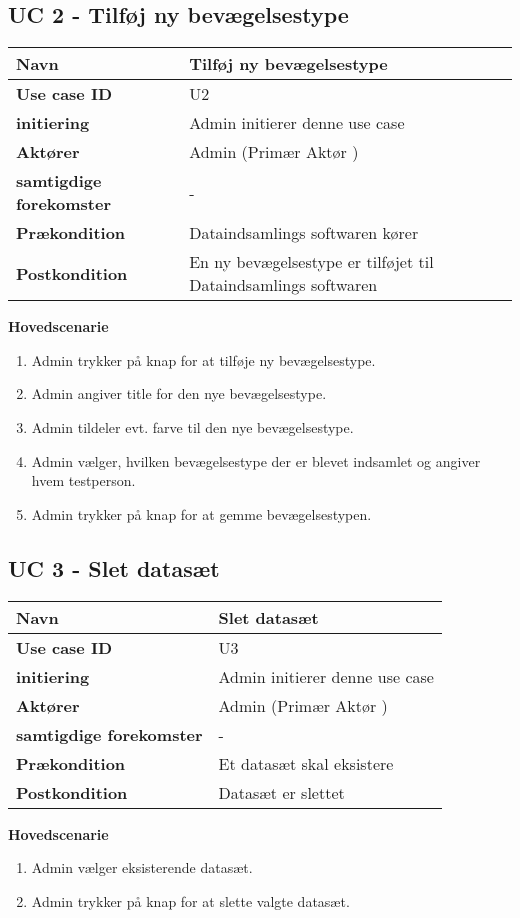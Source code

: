 \subsection{UC 2 - Tilføj ny bevægelsestype}
\begin{table}[htbp] 
	\begin{tabular}{|p{5cm}|p{9cm}|}
		\hline
		\textbf{Navn} & Tilføj ny bevægelsestype \\ \hline
		\textbf{Use case ID} & U2 \\ \hline
		\textbf{initiering} & Admin initierer denne use case \\ \hline
		\textbf{Aktører} & Admin (Primær Aktør ) \\ \hline
		\textbf{samtigdige forekomster} & - \\ \hline
		\textbf{Prækondition} & Dataindsamlings softwaren kører \\ \hline
		\textbf{Postkondition} & En ny bevægelsestype er tilføjet til Dataindsamlings softwaren \\ \hline
	\end{tabular}
\end{table}
\textbf{Hovedscenarie}
\begin{enumerate}
	\item Admin trykker på knap for at tilføje ny bevægelsestype.
	\item Admin angiver title for den nye bevægelsestype.
	\item Admin tildeler evt. farve til den nye bevægelsestype.
	\item Admin vælger, hvilken bevægelsestype der er blevet indsamlet og angiver hvem testperson.
	\item Admin trykker på knap for at gemme bevægelsestypen.
\end{enumerate}

\subsection{UC 3 - Slet datasæt}
\begin{table}[htbp] 
	\begin{tabular}{|p{5cm}|p{9cm}|}
		\hline
		\textbf{Navn} & Slet datasæt \\ \hline
		\textbf{Use case ID} & U3 \\ \hline
		\textbf{initiering} & Admin initierer denne use case \\ \hline
		\textbf{Aktører} & Admin (Primær Aktør ) \\ \hline
		\textbf{samtigdige forekomster} & - \\ \hline
		\textbf{Prækondition} & Et datasæt skal eksistere \\ \hline
		\textbf{Postkondition} & Datasæt er slettet \\ \hline
	\end{tabular}
\end{table}
\textbf{Hovedscenarie}
\begin{enumerate}
	\item Admin vælger eksisterende datasæt.
	\item Admin trykker på knap for at slette valgte datasæt.
\end{enumerate}

